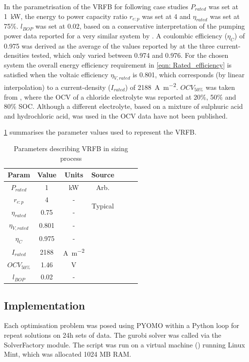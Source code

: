 \documentclass[preprint,3p,review,authoryear,10pt]{elsarticle}
\begin{document}
In the parametrisation of the VRFB for following case studies $P_{rated}$ was set at \SI{1}{\kilo\watt}, the energy to power capacity ratio $r_{e:p}$ was set at 4 and $\eta_{rated}$ was set at 75\%. $l_{BOP}$ was set at 0.02, based on a conservative interpretation of the pumping power data reported for a very similar system by \cite{Kim2013}. A coulombic efficiency ($\eta_C$) of 0.975 was derived as the average of the values reported by \cite{Reed2016} at the three current-densities tested, which only varied between 0.974 and 0.976.  For the chosen system the overall energy efficiency requirement in \cref{eqn: Rated_efficiency} is satisfied when the voltaic efficiency $\eta_{V,rated}$ is 0.801, which corresponds (by linear interpolation) to a current-density ($I_{rated}$) of \SI{2188}{\ampere\per\square\meter}. $OCV_{50\%}$ was taken from \cite{Kim2011}, where the OCV of a chloride electrolyte was reported at 20\%, 50\% and 80\% SOC. Although a different electrolyte, based on a mixture of sulphuric acid and hydrochloric acid, was used in \cite{Reed2016} the OCV data have not been published.

\cref{tab:VRFB_Sizing_Params} summarises the parameter values used to represent the VRFB.

\begin{table}[!pht]
\captionsetup{font=normalsize}
\centering
\caption{Parameters describing VRFB in sizing process}
\label{tab:VRFB_Sizing_Params}
\begin{tabular}{ccccccc}
\hline
Param &  Value & Units &  Source \\
\hline
$P_{rated}$ & 1 & \si{\kilo\watt} & Arb.\\
$r_{e:p}$ & 4 & - & \multirow{2}{*}{Typical}\\
$\eta_{rated}$ & 0.75 & - \\
\hline
$\eta_{V,rated}$ & 0.801 & - &\multirow{3}{*}{\cite{Reed2016}}\\
$\eta_C$ & 0.975 & -\\
$I_{rated}$ & 2188 & \si{\ampere\per\square\meter} \\
\hline
$OCV_{50\%}$ & 1.46 & \si{\volt} & \cite{Kim2011}\\
$l_{BOP}$ & 0.02 & - & \cite{Kim2013}\\

\hline
\end{tabular}
\end{table}

\subsection{Implementation}
\label{Results_Implementation}
Each optimisation problem was posed using PYOMO within a Python loop for repeat solutions on 24h sets of data. The gurobi solver was called via the SolverFactory module. The script was run on a virtual machine (\cite{VirtualBox}) running Linux Mint, which was allocated 1024 MB RAM.
\end{document}
